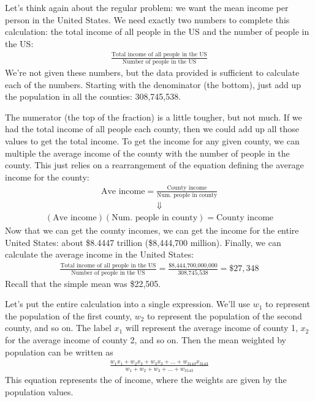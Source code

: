Let's think again about the regular problem: we want the mean income per person in the United States. We need exactly two numbers to complete this calculation: the total income of all people in the US and the number of people in the US:
\begin{align*}
\frac{\text{Total income of all people in the US}}{\text{Number of people in the US}}
\end{align*}
We're not given these numbers, but the data provided is sufficient to calculate each of the numbers. Starting with the denominator (the bottom), just add up the population in all the counties: 308,745,538.

The numerator (the top of the fraction) is a little tougher, but not much. If we had the total income of all people each county, then we could add up all those values to get the total income. To get the income for any given county, we can multiple the average income of the county with the number of people in the county. This just relies on a rearrangement of the equation defining the average income for the county:
\begin{align*}
\text{Ave income} = \frac{\text{County income}}{\text{Num. people in county}}
\end{align*}
\begin{align*}
\Downarrow
\end{align*}
\begin{align*}
(\text{Ave income})(\text{Num. people in county}) = \text{County income}
\end{align*}
Now that we can get the county incomes, we can get the income for the entire United States: about \$8.4447 trillion (\$8,444,700 million). Finally, we can calculate the average income in the United States:
\begin{align*}
\frac{\text{Total income of all people in the US}}{\text{Number of people in the US}}
	= \frac{\text{\$8,444,700,000,000}}{\text{308,745,538}} = \$27,348
\end{align*}
Recall that the simple mean was \$22,505.

Let's put the entire calculation into a single expression. We'll use $w_1$ to represent the population of the first county, $w_2$ to represent the population of the second county, and so on. The label $x_1$ will represent the average income of county 1, $x_2$ for the average income of county 2, and so on. Then the mean weighted by population can be written as
\begin{align*}
\frac{w_{1}x_{1} + w_{2}x_{2} + w_{3}x_{3} + \dots + w_{3143}x_{3143}}
	{w_{1} + w_{2} + w_{3} + \dots + w_{3143}}
\end{align*}
This equation represents the  of income, where the weights are given by the population values.

